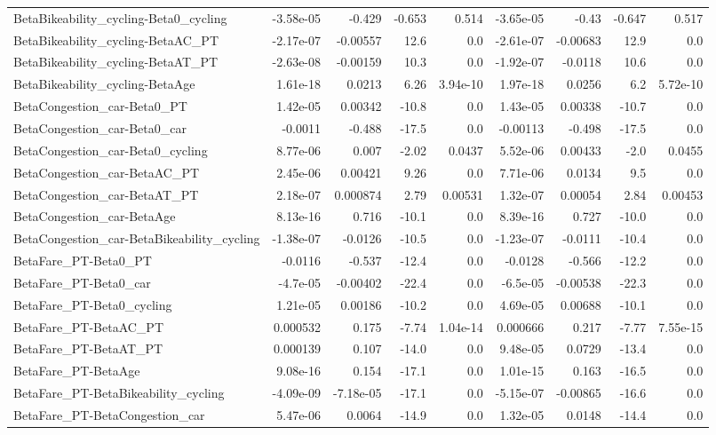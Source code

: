 \begin{tabular}{lrrrrrrrr}
BetaBikeability_cycling-Beta0_cycling & -3.58e-05 & -0.429 & -0.653 & 0.514 & -3.65e-05 & -0.43 & -0.647 & 0.517 \\
BetaBikeability_cycling-BetaAC_PT & -2.17e-07 & -0.00557 & 12.6 & 0.0 & -2.61e-07 & -0.00683 & 12.9 & 0.0 \\
BetaBikeability_cycling-BetaAT_PT & -2.63e-08 & -0.00159 & 10.3 & 0.0 & -1.92e-07 & -0.0118 & 10.6 & 0.0 \\
BetaBikeability_cycling-BetaAge & 1.61e-18 & 0.0213 & 6.26 & 3.94e-10 & 1.97e-18 & 0.0256 & 6.2 & 5.72e-10 \\
BetaCongestion_car-Beta0_PT & 1.42e-05 & 0.00342 & -10.8 & 0.0 & 1.43e-05 & 0.00338 & -10.7 & 0.0 \\
BetaCongestion_car-Beta0_car & -0.0011 & -0.488 & -17.5 & 0.0 & -0.00113 & -0.498 & -17.5 & 0.0 \\
BetaCongestion_car-Beta0_cycling & 8.77e-06 & 0.007 & -2.02 & 0.0437 & 5.52e-06 & 0.00433 & -2.0 & 0.0455 \\
BetaCongestion_car-BetaAC_PT & 2.45e-06 & 0.00421 & 9.26 & 0.0 & 7.71e-06 & 0.0134 & 9.5 & 0.0 \\
BetaCongestion_car-BetaAT_PT & 2.18e-07 & 0.000874 & 2.79 & 0.00531 & 1.32e-07 & 0.00054 & 2.84 & 0.00453 \\
BetaCongestion_car-BetaAge & 8.13e-16 & 0.716 & -10.1 & 0.0 & 8.39e-16 & 0.727 & -10.0 & 0.0 \\
BetaCongestion_car-BetaBikeability_cycling & -1.38e-07 & -0.0126 & -10.5 & 0.0 & -1.23e-07 & -0.0111 & -10.4 & 0.0 \\
BetaFare_PT-Beta0_PT & -0.0116 & -0.537 & -12.4 & 0.0 & -0.0128 & -0.566 & -12.2 & 0.0 \\
BetaFare_PT-Beta0_car & -4.7e-05 & -0.00402 & -22.4 & 0.0 & -6.5e-05 & -0.00538 & -22.3 & 0.0 \\
BetaFare_PT-Beta0_cycling & 1.21e-05 & 0.00186 & -10.2 & 0.0 & 4.69e-05 & 0.00688 & -10.1 & 0.0 \\
BetaFare_PT-BetaAC_PT & 0.000532 & 0.175 & -7.74 & 1.04e-14 & 0.000666 & 0.217 & -7.77 & 7.55e-15 \\
BetaFare_PT-BetaAT_PT & 0.000139 & 0.107 & -14.0 & 0.0 & 9.48e-05 & 0.0729 & -13.4 & 0.0 \\
BetaFare_PT-BetaAge & 9.08e-16 & 0.154 & -17.1 & 0.0 & 1.01e-15 & 0.163 & -16.5 & 0.0 \\
BetaFare_PT-BetaBikeability_cycling & -4.09e-09 & -7.18e-05 & -17.1 & 0.0 & -5.15e-07 & -0.00865 & -16.6 & 0.0 \\
BetaFare_PT-BetaCongestion_car & 5.47e-06 & 0.0064 & -14.9 & 0.0 & 1.32e-05 & 0.0148 & -14.4 & 0.0 \\

\end{tabular}

